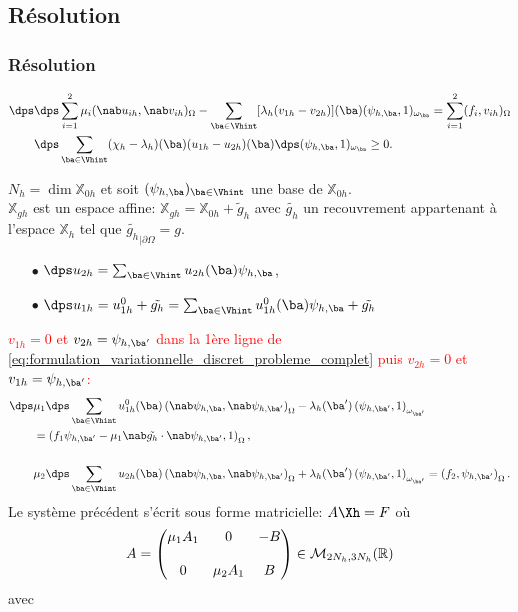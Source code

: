 \documentclass{beamer}
\begin{document}
\subsection{Résolution}
\begin{frame}
\frametitle{Résolution}
\begin{align}
\dps
&\nonumber \dps \sum_{i=1}^2 \mu_i  (\nab u_{ih},\nab v_{ih})_{\Omega}-\sum_{{\ba}\in \Vhint}[\lambda_h(v_{1h}-v_{2h})]({\ba})(\psi_{h,\ba},1)_{\omega_{\ba}}= \sum_{i=1}^2  (f_i,v_{ih})_{\Omega} \\
&\dps \sum_{{\ba}\in \Vhint}(\chi_h-\lambda_h)({\ba})(u_{1h}-u_{2h})({\ba})\dps (\psi_{h,\ba},1)_{\omega_{\ba}}\geq 0.\label{eq:formulation_variationnelle_discret_probleme_complet}
\end{align}

$N_h=\dim \mathbb{X}_{0h}$ et soit $(\psi_{h,\ba})_{\ba \in \Vhint}$ une base de $\mathbb{X}_{0h}$.\\
$\mathbb{X}_{gh}$ est un espace affine: $\mathbb{X}_{gh}=\mathbb{X}_{0h}+\tilde{g}_h$ avec $\tilde{g_h}$ un recouvrement appartenant à l'espace ${\mathbb{X}}_h$ tel que $\tilde{g_h}_{|\partial\Omega}=g$.
\begin{itemize}
\item[$\bullet$]$\dps u_{2h}=\sum_{{\ba}\in \Vhint} u_{2h}({\ba})\psi_{h,{\ba}}$,
\item[$\bullet$]$\dps u_{1h}=u_{1h}^0+\tilde{g_h}=\sum_{{\ba}\in\Vhint} u_{1h}^0({\ba})\psi_{h,{\ba}}+\tilde{g_h}$
\end{itemize}

\end{frame}
\begin{frame}
\textcolor{red}{$v_{1h}=0$ et $v_{2h}=\psi_{h,\ba'}$ dans la 1ère ligne de \eqref{eq:formulation_variationnelle_discret_probleme_complet} puis $v_{2h}=0$ et $v_{1h}=\psi_{h,\ba'}$:}
\begin{align*}
\dps
&\mu_1 \dps \sum_{{\ba}\in\Vhint} u_{1h}^0({\ba}) \left(\nab \psi_{h,{\ba}},\nab \psi_{h,{\ba}'}\right)_{\Omega}-\lambda_h({{\ba}'}) \left(\psi_{h,{\ba}'},1\right)_{\omega_{{\ba}'}}\\
&=\left(f_1 \psi_{h,{\ba}'}-\mu_1\nab \tilde{g_h} \cdot \nab \psi_{h,{\ba}'},1\right)_{\Omega},\\\\
&\mu_2 \dps \sum_{{\ba}\in\Vhint} u_{2h}({\ba}) \left(\nab \psi_{h,{\ba}}, \nab \psi_{h,{\ba}'}\right)_{\Omega}+\lambda_h({{\ba}'}) \left(\psi_{h,{\ba}'},1\right)_{\omega_{{\ba}'}}=\left(f_2,\psi_{h,{\ba}'}\right)_{\Omega}.
\end{align*}
Le système précédent s'écrit sous forme matricielle: $A\Xh=F$ où
\begin{equation}
A=
\begin{pmatrix}
\mu_1 {\Huge A_1} & {\Huge 0} & {\Huge -B}\\\\
{\Huge 0} &\mu_2 {\Huge A_1} &{\Huge B} 
\end{pmatrix}\in \mathcal{M}_{2N_h,3N_h}(\mathbb{R})
\label{eq:matrice_rigidité}
\end{equation}
avec 
\end{frame}
\end{document}
